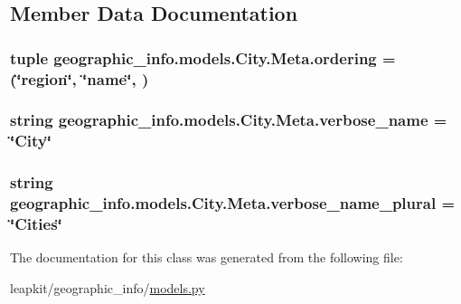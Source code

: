 \subsection{Member Data Documentation}
\hypertarget{classgeographic__info_1_1models_1_1_city_1_1_meta_a324ac8e51af2ab2a771aec417b0a5153}{
\subsubsection[{ordering}]{\setlength{\rightskip}{0pt plus 5cm}tuple geographic\-\_\-info.\-models.\-City.\-Meta.\-ordering = (\char`\"{}region\char`\"{}, \char`\"{}{\bf name}\char`\"{}, )\hspace{0.3cm}{\ttfamily [static]}}}\label{classgeographic__info_1_1models_1_1_city_1_1_meta_a324ac8e51af2ab2a771aec417b0a5153}
\hypertarget{classgeographic__info_1_1models_1_1_city_1_1_meta_a5b82185ab92ff515a86ed1482d0037ba}{
\subsubsection[{verbose\-\_\-name}]{\setlength{\rightskip}{0pt plus 5cm}string geographic\-\_\-info.\-models.\-City.\-Meta.\-verbose\-\_\-name = \char`\"{}City\char`\"{}\hspace{0.3cm}{\ttfamily [static]}}}\label{classgeographic__info_1_1models_1_1_city_1_1_meta_a5b82185ab92ff515a86ed1482d0037ba}
\hypertarget{classgeographic__info_1_1models_1_1_city_1_1_meta_aa241fa97475f8ecd08dbce2cc4e3d4a3}{
\subsubsection[{verbose\-\_\-name\-\_\-plural}]{\setlength{\rightskip}{0pt plus 5cm}string geographic\-\_\-info.\-models.\-City.\-Meta.\-verbose\-\_\-name\-\_\-plural = \char`\"{}Cities\char`\"{}\hspace{0.3cm}{\ttfamily [static]}}}\label{classgeographic__info_1_1models_1_1_city_1_1_meta_aa241fa97475f8ecd08dbce2cc4e3d4a3}


The documentation for this class was generated from the following file\-:\begin{DoxyCompactItemize}
\item 
leapkit/geographic\-\_\-info/\hyperlink{geographic__info_2models_8py}{models.\-py}\end{DoxyCompactItemize}
